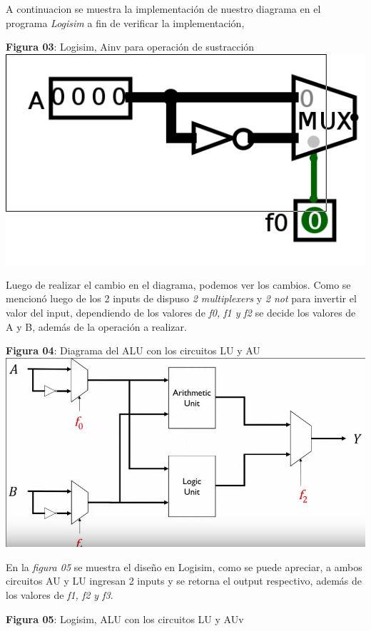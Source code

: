 \documentclass[11pt]{article}
\begin{document}
\begin{question}
{\begin{center}
	\end{center}
	A continuacion se muestra la implementación de nuestro diagrama en el programa \textit{Logisim} a fin de verificar la implementación, 
	\begin{center} \textbf{Figura 03}: Logisim, Ainv para operación de sustracción 
		\includegraphics[scale=0.4]{IMAGES_03}
	\end{center}
	Luego de realizar el cambio en el diagrama, podemos ver los cambios. Como se mencionó luego de los 2 inputs de dispuso \textit{2 multiplexers} y \textit{2 not} para invertir el valor del input, dependiendo de los valores de \textit{f0, f1 y f2} se decide los valores de A y B, además de la operación a realizar.
	\begin{center} \textbf{Figura 04}: Diagrama del ALU con los circuitos LU y AU
		\includegraphics[scale=0.3]{IMAGES_04} 
	\end{center}
	En la \emph{figura 05} se muestra el diseño en Logisim, como se puede apreciar, a ambos circuitos AU y LU ingresan 2 inputs y se retorna el output respectivo, además de los valores de \textit{f1, f2 y f3}.
	\begin{center} \textbf{Figura 05}: Logisim, ALU con los circuitos LU y AUv 

\end{center}}
\end{question}
\end{document}
